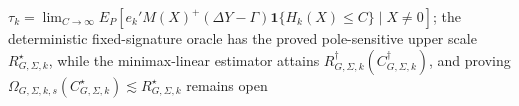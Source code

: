 \(\tau_k=\lim_{C\to\infty}E_P[e_k'M(X)^+(\Delta Y-\Gamma)\mathbf 1\{H_k(X)\le C\}\mid X\ne0]\); the deterministic fixed-signature oracle has the proved pole-sensitive upper scale \(R_{G,\Sigma,k}^{\star}\), while the minimax-linear estimator attains \(R_{G,\Sigma,k}^{\dagger}(C_{G,\Sigma,k}^{\dagger})\), and proving \(\Omega_{G,\Sigma,k,s}(C_{G,\Sigma,k}^{\star})\lesssim R_{G,\Sigma,k}^{\star}\) remains open